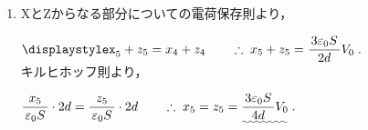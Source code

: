 ﻿\documentclass[../../../ps_a.tex]{subfiles}
\begin{document}
\begin{enumerate}
            \myspaceb%
            $\displaystyle%
                \myfracc{x_4}{\varepsilon_0 S} \cdot 2d%
                = \myfracc{z_4}{\varepsilon_0 S} \cdot d%
                = V_0 \;.
            $

            \myspaceb%
            $\displaystyle%
                \therefore \; x_4%
                = \uwave{\myfracc{\varepsilon_0 S}{2d} V_0} \;,%
                \quad z_4 = \uwave{\myfracc{\varepsilon_0 S}{d} V_0} \;.
            $
        \item XとZからなる部分についての電荷保存則より，
            
            \myspaceb%
            $\displaystyle%
                x_5 + z_5 = x_4 + z_4%
                \qquad \therefore \; x_5 + z_5 =%
                \myfracc{3\varepsilon_0 S}{2d} V_0 \;.
            $\\
            キルヒホッフ則より，
            
            \myspaceb%
            $\displaystyle%
                \myfracc{x_5}{\varepsilon_0 S} \cdot 2d%
                = \myfracc{z_5}{\varepsilon_0 S} \cdot 2d%
                \qquad \therefore \; x_5 = z_5%
                =\uwave{\myfracc{3\varepsilon_0 S}{4d} V_0} \;.
            $
    \end{enumerate}
\end{document}
